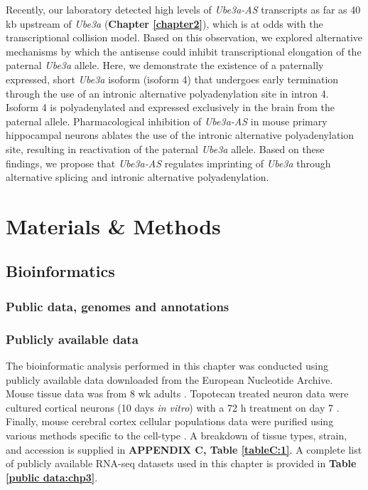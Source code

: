 Recently, our laboratory detected high levels of \textit{Ube3a-AS} transcripts as far as 40 kb upstream of \textit{Ube3a} (\textbf{Chapter \ref{chapter2}}), which is at odds with the transcriptional collision model.  Based on this observation, we explored alternative mechanisms by which the antisense could inhibit transcriptional elongation of the paternal \textit{Ube3a} allele. Here, we demonstrate the existence of a paternally expressed, short \textit{Ube3a} isoform (isoform 4) that undergoes early termination through the use of an intronic alternative polyadenylation site in intron 4.  Isoform 4 is polyadenylated and expressed exclusively in the brain from the paternal allele. Pharmacological inhibition of \textit{Ube3a-AS} in mouse primary hippocampal neurons ablates the use of the intronic alternative polyadenylation site, resulting in reactivation of the paternal \textit{Ube3a} allele.  Based on these findings, we propose that \textit{Ube3a-AS} regulates imprinting of \textit{Ube3a} through alternative splicing and intronic alternative polyadenylation.

\section{Materials \& Methods}
\subsection{Bioinformatics}
\subsubsection{Public data, genomes and annotations}

\subsubsection*{Publicly available data}
The bioinformatic analysis performed in this chapter was conducted using publicly available data downloaded from the European Nucleotide Archive. Mouse tissue data was from 8 wk adults \cite{Pervouchine2015}. Topotecan treated neuron data were cultured cortical neurons (10 days \textit{in vitro}) with a 72 h treatment on day 7 \cite{King2013}. Finally, mouse cerebral cortex cellular populations data were purified using various methods specific to the cell-type \cite{Zhang2014}. A breakdown of tissue types, strain, and accession is supplied in \textbf{APPENDIX C, Table \ref{tableC:1}}. A complete list of publicly available RNA-seq datasets used in this chapter is provided in \textbf{Table \ref{public data:chp3}}. 

